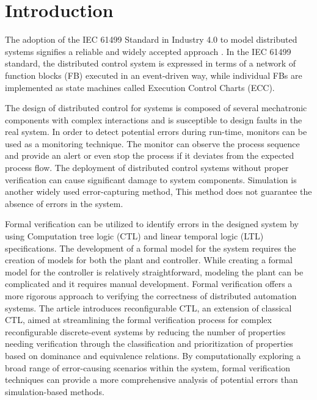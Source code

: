 \documentclass{ieeeojies}
\begin{document}
\maketitle

\section{Introduction}

The adoption of the IEC 61499 \cite{iec61499part12012} Standard in Industry 4.0 to model distributed systems signifies a reliable and widely accepted approach \cite{dai2017discrete}. In the IEC 61499 standard, the distributed control system is expressed in terms of a network of function blocks (FB) executed in an event-driven way, while individual FBs are implemented as state machines \cite{dai2012redesign,lewis2001modelling,frey2006modeling} 
called Execution Control Charts (ECC).


The design of distributed control for systems is composed of several mechatronic components with complex interactions and is susceptible to design faults in the real system. In order to detect potential errors during run-time, monitors \cite{wenger2015behavioral,do2020towards} can be used as a monitoring technique. The monitor can observe the process sequence and provide an alert or even stop the process if it deviates from the expected process flow. The deployment of distributed control systems without proper verification can cause significant damage to system components. Simulation \cite{ hegny2010iec} is another widely used error-capturing method, This method does not guarantee the absence of errors in the system. 

Formal verification \cite{patil2015formal,blech2016comparison} can be utilized to identify errors in the designed system by using Computation tree logic (CTL) and linear temporal logic (LTL) specifications. The development of a formal model for the system requires the creation of models for both the plant and controller. While creating a formal model for the controller is relatively straightforward, modeling the plant can be complicated and it requires manual development. Formal verification \cite{cengic2010formal1} offers a more rigorous approach to verifying the correctness of distributed automation systems. The article \cite{ramdani2020rctl} introduces reconfigurable CTL, an extension of classical CTL, aimed at streamlining the formal verification process for complex reconfigurable discrete-event systems by reducing the number of properties needing verification through the classification and prioritization of properties based on dominance and equivalence relations. By computationally exploring a broad range of error-causing scenarios within the system, formal verification techniques can provide a more comprehensive analysis of potential errors than simulation-based methods.
\end{document}
